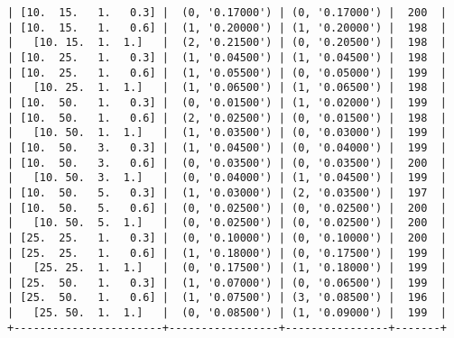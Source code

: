 \documentclass{article}
\begin{document}
\begin{verbatim}
| [10.  15.   1.   0.3] |  (0, '0.17000') | (0, '0.17000') |  200  |
| [10.  15.   1.   0.6] |  (1, '0.20000') | (1, '0.20000') |  198  |
|   [10. 15.  1.  1.]   |  (2, '0.21500') | (0, '0.20500') |  198  |
| [10.  25.   1.   0.3] |  (1, '0.04500') | (1, '0.04500') |  198  |
| [10.  25.   1.   0.6] |  (1, '0.05500') | (0, '0.05000') |  199  |
|   [10. 25.  1.  1.]   |  (1, '0.06500') | (1, '0.06500') |  198  |
| [10.  50.   1.   0.3] |  (0, '0.01500') | (1, '0.02000') |  199  |
| [10.  50.   1.   0.6] |  (2, '0.02500') | (0, '0.01500') |  198  |
|   [10. 50.  1.  1.]   |  (1, '0.03500') | (0, '0.03000') |  199  |
| [10.  50.   3.   0.3] |  (1, '0.04500') | (0, '0.04000') |  199  |
| [10.  50.   3.   0.6] |  (0, '0.03500') | (0, '0.03500') |  200  |
|   [10. 50.  3.  1.]   |  (0, '0.04000') | (1, '0.04500') |  199  |
| [10.  50.   5.   0.3] |  (1, '0.03000') | (2, '0.03500') |  197  |
| [10.  50.   5.   0.6] |  (0, '0.02500') | (0, '0.02500') |  200  |
|   [10. 50.  5.  1.]   |  (0, '0.02500') | (0, '0.02500') |  200  |
| [25.  25.   1.   0.3] |  (0, '0.10000') | (0, '0.10000') |  200  |
| [25.  25.   1.   0.6] |  (1, '0.18000') | (0, '0.17500') |  199  |
|   [25. 25.  1.  1.]   |  (0, '0.17500') | (1, '0.18000') |  199  |
| [25.  50.   1.   0.3] |  (1, '0.07000') | (0, '0.06500') |  199  |
| [25.  50.   1.   0.6] |  (1, '0.07500') | (3, '0.08500') |  196  |
|   [25. 50.  1.  1.]   |  (0, '0.08500') | (1, '0.09000') |  199  |
+-----------------------+-----------------+----------------+-------+
\end{verbatim}
\end{document}
